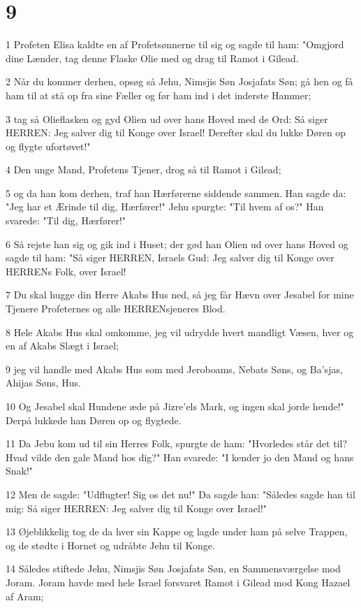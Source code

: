 \chapter{9}

\par 1 Profeten Elisa kaldte en af Profetsønnerne til sig og sagde til ham: "Omgjord dine Lænder, tag denne Flaske Olie med og drag til Ramot i Gilead.
\par 2 Når du kommer derhen, opsøg så Jehu, Nimsjis Søn Josjafats Søn; gå hen og få ham til at stå op fra sine Fæller og før ham ind i det inderste Hammer;
\par 3 tag så Olieflasken og gyd Olien ud over hans Hoved med de Ord: Så siger HERREN: Jeg salver dig til Konge over Israel! Derefter skal du lukke Døren op og flygte ufortøvet!"
\par 4 Den unge Mand, Profetens Tjener, drog så til Ramot i Gilead;
\par 5 og da han kom derhen, traf han Hærførerne siddende sammen. Han sagde da: "Jeg har et Ærinde til dig, Hærfører!" Jehu spurgte: "Til hvem af os?" Han svarede: "Til dig, Hærfører!"
\par 6 Så rejste han sig og gik ind i Huset; der gød han Olien ud over hans Hoved og sagde til ham: "Så siger HERREN, Israels Gud: Jeg salver dig til Konge over HERRENs Folk, over Israel!
\par 7 Du skal hugge din Herre Akabs Hus ned, så jeg får Hævn over Jesabel for mine Tjenere Profeternes og alle HERRENsjeneres Blod.
\par 8 Hele Akabs Hus skal omkomme, jeg vil udrydde hvert mandligt Væsen, hver og en af Akabs Slægt i Israel;
\par 9 jeg vil handle med Akabs Hus som med Jeroboams, Nebats Søns, og Ba'sjas, Ahijas Søns, Hus.
\par 10 Og Jesabel skal Hundene æde på Jizre'els Mark, og ingen skal jorde hende!" Derpå lukkede han Døren op og flygtede.
\par 11 Da Jebu kom ud til sin Herres Folk, spurgte de ham: "Hvorledes står det til? Hvad vilde den gale Mand hos dig?" Han svarede: "I kender jo den Mand og hans Snak!"
\par 12 Men de sagde: "Udflugter! Sig os det nu!" Da sagde han: "Således sagde han til mig: Så siger HERREN: Jeg salver dig til Konge over Israel!"
\par 13 Øjeblikkelig tog de da hver sin Kappe og lagde under ham på selve Trappen, og de stødte i Hornet og udråbte Jehu til Konge.
\par 14 Således stiftede Jehu, Nimsjis Søn Josjafats Søn, en Sammensværgelse mod Joram. Joram havde med hele Israel forsvaret Ramot i Gilead mod Kong Hazael af Aram;
